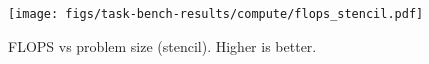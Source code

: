 \begin{figure}[t]
\centering
\texttt{[image: figs/task-bench-results/compute/flops\_stencil.pdf]}
\caption{FLOPS vs problem size (stencil). Higher is better.\label{fig:flops}}
\end{figure}
